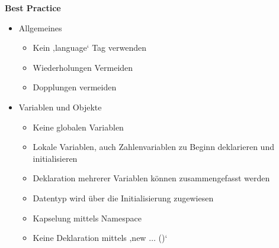 \documentclass[twoside]{report}
\begin{document}
\textbf{Best Practice}\par

\begin{itemize}
	\item Allgemeines\par

\begin{itemize}
	\item Kein ‚language‘ Tag verwenden\par

	\item Wiederholungen Vermeiden\par

	\item Dopplungen vermeiden\par


\end{itemize}
\end{itemize}
\begin{itemize}
	\item Variablen und Objekte\par

\begin{itemize}
	\item Keine globalen Variablen

	\item Lokale Variablen, auch Zahlenvariablen zu Beginn deklarieren und initialisieren\par

	\item Deklaration mehrerer Variablen können zusammengefasst werden\par

	\item Datentyp wird über die Initialisierung zugewiesen\par

	\item Kapselung mittels Namespace\par

	\item Keine Deklaration mittels ‚new $ \ldots $ ()‘\par

\end{itemize}
\end{itemize}
\end{document}
